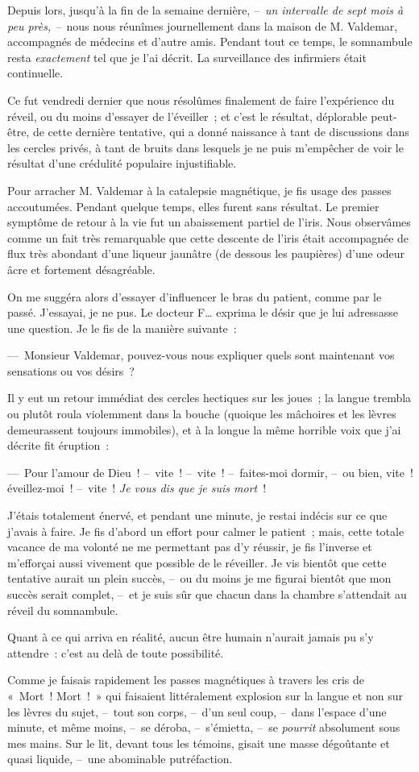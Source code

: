 \documentclass[french,twoside]{book} %
\begin{document}
Depuis lors, jusqu’à la fin de la semaine dernière, – \emph{un intervalle de sept mois à peu près, –} nous nous réunîmes journellement dans la maison de M. Valdemar, accompagnés de médecins et d’autre amis. Pendant tout ce temps, le somnambule resta \emph{exactement} tel que je l’ai décrit. La surveillance des infirmiers était continuelle.\par
Ce fut vendredi dernier que nous résolûmes finalement de faire l’expérience du réveil, ou du moins d’essayer de l’éveiller ; et c’est le résultat, déplorable peut-être, de cette dernière tentative, qui a donné naissance à tant de discussions dans les cercles privés, à tant de bruits dans lesquels je ne puis m’empêcher de voir le résultat d’une crédulité populaire injustifiable.\par
Pour arracher M. Valdemar à la catalepsie magnétique, je fis usage des passes accoutumées. Pendant quelque temps, elles furent sans résultat. Le premier symptôme de retour à la vie fut un abaissement partiel de l’iris. Nous observâmes comme un fait très remarquable que cette descente de l’iris était accompagnée de flux très abondant d’une liqueur jaunâtre (de dessous les paupières) d’une odeur âcre et fortement désagréable.\par
On me suggéra alors d’essayer d’influencer le bras du patient, comme par le passé. J’essayai, je ne pus. Le docteur F… exprima le désir que je lui adressasse une question. Je le fis de la manière suivante :\par
— Monsieur Valdemar, pouvez-vous nous expliquer quels sont maintenant vos sensations ou vos désirs ?\par
Il y eut un retour immédiat des cercles hectiques sur les joues ; la langue trembla ou plutôt roula violemment dans la bouche (quoique les mâchoires et les lèvres demeurassent toujours immobiles), et à la longue la même horrible voix que j’ai décrite fit éruption :\par
— Pour l’amour de Dieu ! – vite ! – vite ! – faites-moi dormir, – ou bien, vite ! éveillez-moi ! – vite ! \emph{Je vous dis que je suis mort} !\par
J’étais totalement énervé, et pendant une minute, je restai indécis sur ce que j’avais à faire. Je fis d’abord un effort pour calmer le patient ; mais, cette totale vacance de ma volonté ne me permettant pas d’y réussir, je fis l’inverse et m’efforçai aussi vivement que possible de le réveiller. Je vis bientôt que cette tentative aurait un plein succès, – ou du moins je me figurai bientôt que mon succès serait complet, – et je suis sûr que chacun dans la chambre s’attendait au réveil du somnambule.\par
Quant à ce qui arriva en réalité, aucun être humain n’aurait jamais pu s’y attendre : c’est au delà de toute possibilité.\par
Comme je faisais rapidement les passes magnétiques à travers les cris de « Mort ! Mort ! » qui faisaient littéralement explosion sur la langue et non sur les lèvres du sujet, – tout son corps, – d’un seul coup, – dans l’espace d’une minute, et même moins, – se déroba, – s’émietta, – se \emph{pourrit} absolument sous mes mains. Sur le lit, devant tous les témoins, gisait une masse dégoûtante et quasi liquide, – une abominable putréfaction.
\end{document}

